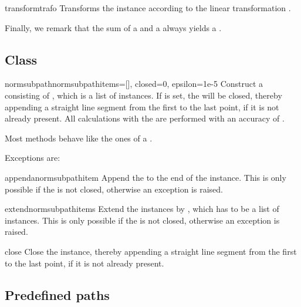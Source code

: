 \begin{methoddesc}{transform}{trafo}
  Transforms the  instance according to the linear
  transformation .
\end{methoddesc}

Finally, we remark that the sum of a  and a 
always yields a .


\subsection{Class }

\begin{classdesc}{normsubpath}{normsubpathitems=[], closed=0,
    epsilon=1e-5}
  Construct a  consisting of
  , which is a list of 
  instances. If  is set, the  will be
  closed, thereby appending a straight line segment from the first to
  the last point, if it is not already present. All calculations with
  the  are performed with an accuracy of .
\end{classdesc}

Most  methods behave like the ones of a
.

Exceptions are:

\begin{methoddesc}{append}{anormsubpathitem}
  Append the  to the end of the
   instance. This is only possible if the
   is not closed, otherwise an exception is raised.
\end{methoddesc}

\begin{methoddesc}{extend}{normsubpathitems}
  Extend the  instances by ,
  which has to be a list of  instances. This is
  only possible if the  is not closed, otherwise an
  exception is raised.
\end{methoddesc}

\begin{methoddesc}{close}{}
  Close the  instance, thereby appending a straight
  line segment from the first to the last point, if it is not already
  present.
\end{methoddesc}

\subsection{Predefined paths}

